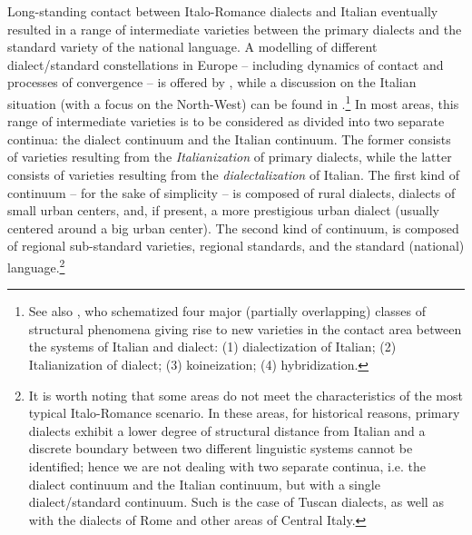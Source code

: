 Long-standing contact between Italo-Romance dialects and Italian eventually resulted in a range of intermediate varieties between the primary dialects and the standard variety of the national language. A modelling of different dialect/standard constellations in Europe – including dynamics of contact and processes of convergence – is offered by \citet{Auer2005}, while a discussion on the Italian situation (with a focus on the North-West) can be found in \citet{CerrutiRegis2014,CerrutiRegis2015}.\footnote{See also \citet{Berruto2005,Berruto2018}, who schematized four major (partially overlapping) classes of structural phenomena giving rise to new varieties in the contact area between the systems of Italian and dialect: (1) dialectization of Italian; (2) Italianization of dialect; (3) koineization; (4) hybridization.} In most areas, this range of intermediate varieties is to be considered as divided into two separate continua: the dialect continuum and the Italian continuum. The former consists of varieties resulting from the \textit{Italianization} of primary dialects, while the latter consists of varieties resulting from the \textit{dialectalization} of Italian. The first kind of continuum – for the sake of simplicity – is composed of rural dialects, dialects of small urban centers, and, if present, a more prestigious urban dialect (usually centered around a big urban center). The second kind of continuum, is composed of regional sub-standard varieties, regional standards, and the standard (national) language.\footnote{It is worth noting that some areas do not meet the characteristics of the most typical Italo-Romance scenario. In these areas, for historical reasons, primary dialects exhibit a lower degree of structural distance from Italian and a discrete boundary between two different linguistic systems cannot be identified; hence we are not dealing with two separate continua, i.e. the dialect continuum and the Italian continuum, but with a single dialect/standard continuum. Such is the case of Tuscan dialects, as well as with the dialects of Rome and other areas of Central Italy.}

